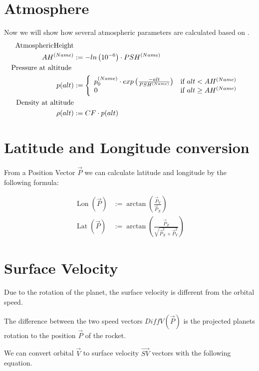 \documentclass[11pt]{article}
\newcommand{\oa}[1]{\overrightarrow{#1}}
\newcommand{\Pos}{\oa{P}}
\newcommand{\Vel}{\oa{V}}
\DeclareMathOperator{\Lat}{Lat}
\DeclareMathOperator{\Lon}{Lon}
\begin{document}
\section{Atmosphere}

Now we will show how several atmospheric parameters are calculated
based on \cite{Atmo}.
\begin{align}
  \textrm{AtmosphericHeight}\nonumber\\
  AH^{(Name)} &:= -ln\left(10^{-6}\right)\cdot PSH^{(Name)}\\
  \textrm{Pressure at altitude }&\nonumber\\
  p(alt) &:=
  \left\{
      \begin{array}{l l}
        p_0^{(Name)} \cdot exp\left({\frac{-alt}{PSH^{(Name)}}}\right) & \textrm{if } alt < AH^{(Name)}\\
        0 &\textrm{if } alt \geq AH^{(Name)}
      \end{array}
    \right.\\
    \textrm{Density at altitude}\nonumber\\
    \rho(alt) &:= CF \cdot p(alt)
\end{align}

\section{Latitude and Longitude conversion}

From a Position Vector $\Pos$ we can calculate latitude
and longitude by the following formula:

\begin{align}
  \Lon(\Pos) &:= \arctan\left(\frac{\Pos_Y}{\Pos_X}\right)\\
  \Lat(\Pos) &:= \arctan\left(\frac{\Pos_Z}{\sqrt{\Pos_X^2+\Pos_Y^2}}\right)
\end{align}

\section{Surface Velocity}

Due to the rotation of the planet, the surface velocity is different from
the orbital speed.

The difference between the two speed vectors $DiffV(\Pos)$ is the
projected planets rotation to the position $\Pos$ of the rocket.

We can convert orbital $\Vel$ to surface velocity $\oa{SV}$
vectors with the following equation.
\end{document}

